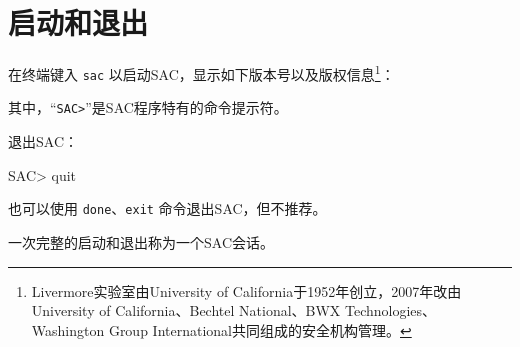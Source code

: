 \section{启动和退出}
在终端键入 \texttt{sac} 以启动SAC，显示如下版本号以及版权信息\footnote{
    Livermore实验室由University of California于1952年创立，2007年改由
    University of California、Bechtel National、BWX Technologies、
    Washington Group International共同组成的安全机构管理。}：
其中，``\texttt{SAC>}''是SAC程序特有的命令提示符。

退出SAC：
\begin{SACCode}
SAC> quit
\end{SACCode}
也可以使用 \texttt{done}、\texttt{exit} 命令退出SAC，但不推荐。

一次完整的启动和退出称为一个SAC会话。
